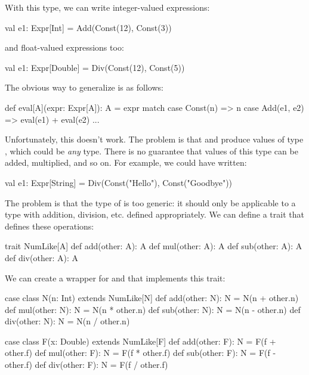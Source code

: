 \documentclass[9pt]{extbook}
\begin{document}
With this type, we can write integer-valued expressions:
\begin{scalacode}
val e1: Expr[Int] = Add(Const(12), Const(3))
\end{scalacode}
and float-valued expressions too:
\begin{scalacode}
val e1: Expr[Double] = Div(Const(12), Const(5))
\end{scalacode}

The obvious way to generalize  is as follows:

\begin{scalacode}
def eval[A](expr: Expr[A]): A = expr match {
  case Const(n) => n
  case Add(e1, e2) => eval(e1) + eval(e2)
  ...
}
\end{scalacode}

Unfortunately, this doesn't work. The problem is that 
and  produce values of type , which could
be \emph{any} type. There is no guarantee that values of this type can
be added, multiplied, and so on. For example, we could have written:

\begin{scalacode}
val e1: Expr[String] = Div(Const("Hello"), Const("Goodbye"))
\end{scalacode}

The problem is that the type of  is too generic: it should
only be applicable to a type with addition, division, etc. defined appropriately.
We can define a trait that defines these operations:

\begin{scalacode}
trait NumLike[A] {
  def add(other: A): A
  def mul(other: A): A
  def sub(other: A): A
  def div(other: A): A
}
\end{scalacode}

We can create a wrapper for  and 
that implements this trait:

\begin{scalacode}
case class N(n: Int) extends NumLike[N] {
  def add(other: N): N = N(n + other.n)
  def mul(other: N): N = N(n * other.n)
  def sub(other: N): N = N(n - other.n)
  def div(other: N): N = N(n / other.n)
}

case class F(x: Double) extends NumLike[F] {
  def add(other: F): N = F(f + other.f)
  def mul(other: F): N = F(f * other.f)
  def sub(other: F): N = F(f - other.f)
  def div(other: F): N = F(f / other.f)
}
\end{scalacode}
\end{document}
